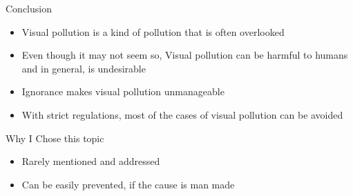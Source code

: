\documentclass{beamer}
\begin{document}
     \begin{frame}{Conclusion}
        \begin{itemize}
            \item Visual pollution is a kind of pollution that is often overlooked
            \item Even though it may not seem so, Visual pollution can be harmful to humans and
                in general, is undesirable
            \item Ignorance makes visual pollution unmanageable
            \item With strict regulations, most of the cases of visual pollution can be avoided
        \end{itemize}
     \end{frame}

     \begin{frame}{Why I Chose this topic}
         \begin{itemize}
            \item Rarely mentioned and addressed
            \item Can be easily prevented, if the cause is man made
        \end{itemize}
     \end{frame}
\end{document}
